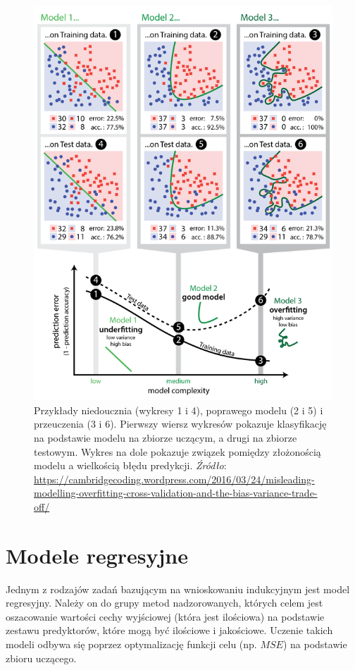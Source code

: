 \documentclass[]{book}
\theoremstyle{plain}
\theoremstyle{definition}
\theoremstyle{definition}
\theoremstyle{definition}
\theoremstyle{definition}
\theoremstyle{remark}
\begin{document}
\begin{figure}
\centering
\includegraphics{images/unde_over_fitting.JPG}
\caption{\label{fig:unnamed-chunk-10}Przykłady niedoucznia (wykresy 1 i 4), poprawego modelu (2 i 5) i przeuczenia (3 i 6). Pierwszy wiersz wykresów pokazuje klasyfikację na podstawie modelu na zbiorze uczącym, a drugi na zbiorze testowym. Wykres na dole pokazuje związek pomiędzy złożonością modelu a wielkością błędu predykcji. \emph{Źródło}: \url{https://cambridgecoding.wordpress.com/2016/03/24/misleading-modelling-overfitting-cross-validation-and-the-bias-variance-trade-off/}}
\end{figure}

\hypertarget{modele-regresyjne}{%
\section{Modele regresyjne}\label{modele-regresyjne}}

Jednym z rodzajów zadań bazującym na wnioskowaniu indukcyjnym jest model regresyjny. Należy on do grupy metod nadzorowanych, których celem jest oszacowanie wartości cechy wyjściowej (która jest ilościowa) na podstawie zestawu predyktorów, które mogą być ilościowe i jakościowe. Uczenie takich modeli odbywa się poprzez optymalizację funkcji celu (np. \(MSE\)) na podstawie zbioru uczącego.
\end{document}
